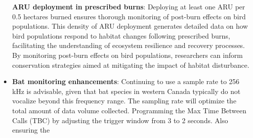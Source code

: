 \documentclass[
  letterpaper,
  DIV=11,
  numbers=noendperiod,
  oneside]{scrartcl}
\begin{document}
\begin{itemize}
  \textbf{ARU deployment in prescribed burns}: Deploying at least one
  ARU per 0.5 hectares burned ensures thorough monitoring of post-burn
  effects on bird populations. This density of ARU deployment generates
  detailed data on how bird populations respond to habitat changes
  following prescribed burns, facilitating the understanding of
  ecosystem resilience and recovery processes. By monitoring post-burn
  effects on bird populations, researchers can inform conservation
  strategies aimed at mitigating the impact of habitat disturbance.
\item
  \textbf{Bat monitoring enhancements}: Continuing to use a sample rate
  to 256 kHz is advisable, given that bat species in western Canada
  typically do not vocalize beyond this frequency range. The sampling
  rate will optimize the total amount of data volume collected.
  Programming the Max Time Between Calls (TBC) by adjusting the trigger
  window from 3 to 2 seconds. Also ensuring the
\end{itemize}
\end{document}
